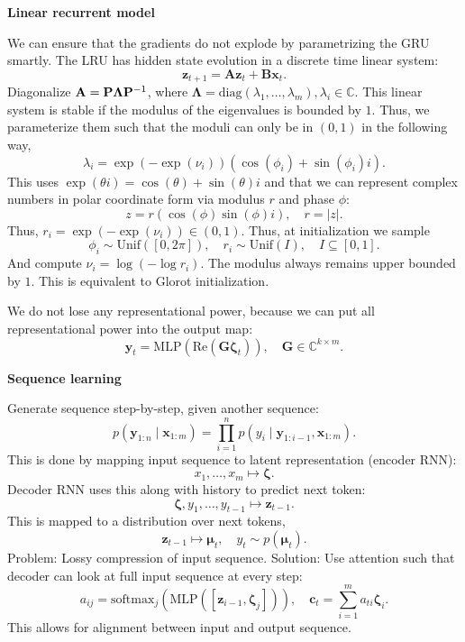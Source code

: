 \documentclass[10pt]{article}
\newenvironment{topic}[1]
{\textbf{\sffamily \footnotesize \colorbox{black}{\rlap{\textbf{\textcolor{white}{#1}}}\hspace{\linewidth}\hspace{-2\fboxsep}}}}
{}
\newenvironment{subtopic}[1]
{\vspace{0.1cm} \begin{center}\textbf{\footnotesize \sffamily #1}\end{center}}
{}
\renewcommand{\mat}[1]{\ensuremath{\mathbf{#1}}}
\renewcommand{\vec}[1]{\ensuremath{\mathbold{#1}}}
\begin{document}
\begin{multicols*}{3}
\begin{topic}{Recurrent neural networks}
\begin{subtopic}{Linear recurrent model}
            We can ensure that the gradients do not explode by parametrizing the GRU smartly. The LRU has
            hidden state evolution in a discrete time linear system: \[
                \vec{z}_{t+1} = \mat{A} \vec{z}_t + \mat{B} \vec{x}_t.
            \]
            Diagonalize $\mat{A} = \mat{P}\mat{\Lambda}\inv{\mat{P}}$, where $\mat{\Lambda} =
                \mathrm{diag}(\lambda_1, \ldots, \lambda_m), \lambda_i \in \mathbb{C}$. This linear system is
            stable if the modulus of the eigenvalues is bounded by $1$. Thus, we parameterize them such that
            the moduli can only be in $(0,1)$ in the following way, \[
                \lambda_i = \exp(-\exp(\nu_i))(\cos(\phi_i) + \sin(\phi_i)i).
            \]
            This uses $\exp(\theta i) = \cos(\theta) + \sin(\theta)i$ and that we can represent complex numbers
            in polar coordinate form via modulus $r$ and phase $\phi$: \[
                z = r(\cos(\phi) \sin(\phi) i), \quad r = |z|.
            \]
            Thus, $r_i = \exp(-\exp(\nu_i)) \in (0,1)$. Thus, at initialization we sample \[
                \phi_i \sim \mathrm{Unif}([0,2\pi]), \quad r_i \sim \mathrm{Unif}(I), \quad I \subseteq [0,1].
            \]
            And compute $\nu_i = \log(-\log r_i)$. The modulus always remains upper bounded by $1$. This is
            equivalent to Glorot initialization.

            We do not lose any representational power, because we can put all representational power into the
            output map: \[
                \vec{y}_t = \mathrm{MLP}(\mathrm{Re}(\mat{G}\vec{\zeta}_t)), \quad \mat{G} \in \mathbb{C}^{k \times m}.
            \]
        \end{subtopic}

        \vfill\null
        \columnbreak

        \begin{subtopic}{Sequence learning}
            Generate sequence step-by-step, given another sequence: \[
                p(\vec{y}_{1:n} \mid \vec{x}_{1:m}) = \prod_{i=1}^n p(y_i \mid \vec{y}_{1:i-1}, \vec{x}_{1:m}).
            \]
            This is done by mapping input sequence to latent representation (encoder RNN): \[
                x_1, \ldots, x_m \mapsto \vec{\zeta}.
            \]
            Decoder RNN uses this along with history to predict next token: \[
                \vec{\zeta}, y_1, \ldots, y_{t-1} \mapsto \vec{z}_{t-1}.
            \]
            This is mapped to a distribution over next tokens, \[
                \vec{z}_{t-1} \mapsto \vec{\mu}_t, \quad y_t \sim p(\vec{\mu}_t).
            \]
            Problem: Lossy compression of input sequence. Solution: Use attention such that decoder can look at
            full input sequence at every step: \[
                a_{ij} = \mathrm{softmax}_j(\mathrm{MLP}([\vec{z}_{i-1}, \vec{\zeta}_j])), \quad \vec{c}_t = \sum_{i=1}^{m} a_{ti} \vec{\zeta}_i.
            \]
            This allows for alignment between input and output sequence.
        \end{subtopic}


\end{topic}
\end{multicols*}
\end{document}
